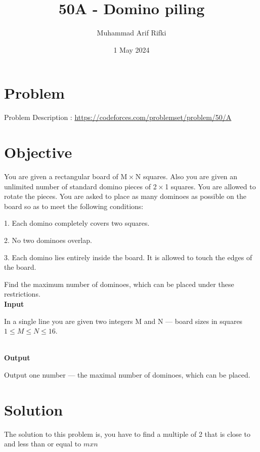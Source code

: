 \documentclass{article}
\title{50A - Domino piling}
\author{Muhammad Arif Rifki}
\date{1 May 2024}
\begin{document}
\maketitle


\section{Problem}

Problem Description : \href{https://codeforces.com/problemset/problem/50/A}{https://codeforces.com/problemset/problem/50/A}

\section{Objective}
You are given a rectangular board of M × N squares. Also you are given an unlimited number of standard domino pieces of 2 × 1 squares. You are allowed to rotate the pieces. You are asked to place as many dominoes as possible on the board so as to meet the following conditions:


1. Each domino completely covers two squares.

2. No two dominoes overlap.

3. Each domino lies entirely inside the board. It is allowed to touch the edges of the board.

Find the maximum number of dominoes, which can be placed under these restrictions.
\\\textbf{Input}

In a single line you are given two integers M and N — board sizes in squares \(1 \leq M \leq N \leq 16\).


\\\textbf{Output}

Output one number — the maximal number of dominoes, which can be placed.

\section{Solution}

The solution to this problem is, you have to find a multiple of 2 that is close to and less than or equal to $m x n$

\end{document}
